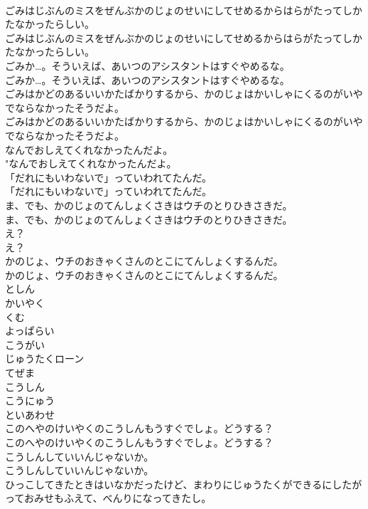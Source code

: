 \documentclass[8pt]{extreport}
\begin{document}
\begin{CJK}{UTF8}{min}
\\	ごみはじぶんのミスをぜんぶかのじょのせいにしてせめるからはらがたってしかたなかったらしい。	
\\	ごみはじぶんのミスをぜんぶかのじょのせいにしてせめるからはらがたってしかたなかったらしい。 
\\	ごみか…。そういえば、あいつのアシスタントはすぐやめるな。	
\\	ごみか…。そういえば、あいつのアシスタントはすぐやめるな。 
\\	ごみはかどのあるいいかたばかりするから、かのじょはかいしゃにくるのがいやでならなかったそうだよ。	
\\	ごみはかどのあるいいかたばかりするから、かのじょはかいしゃにくるのがいやでならなかったそうだよ。 
\\	なんでおしえてくれなかったんだよ。	
\\	"なんでおしえてくれなかったんだよ。 
\\	「だれにもいわないで」っていわれてたんだ。	
\\	「だれにもいわないで」っていわれてたんだ。 
\\	ま、でも、かのじょのてんしょくさきはウチのとりひきさきだ。	
\\	ま、でも、かのじょのてんしょくさきはウチのとりひきさきだ。 
\\	え？	
\\	え？ 
\\	かのじょ、ウチのおきゃくさんのとこにてんしょくするんだ。	
\\	かのじょ、ウチのおきゃくさんのとこにてんしょくするんだ。 
\\	としん
\\	かいやく
\\	くむ
\\	よっぱらい
\\	こうがい
\\	じゅうたくローン
\\	てぜま
\\	こうしん
\\	こうにゅう
\\	といあわせ
\\	このへやのけいやくのこうしんもうすぐでしょ。どうする？	
\\	このへやのけいやくのこうしんもうすぐでしょ。どうする？ 
\\	こうしんしていいんじゃないか。	
\\	こうしんしていいんじゃないか。 
\\	ひっこしてきたときはいなかだったけど、まわりにじゅうたくができるにしたがっておみせもふえて、べんりになってきたし。	

\end{CJK}
\end{document}
